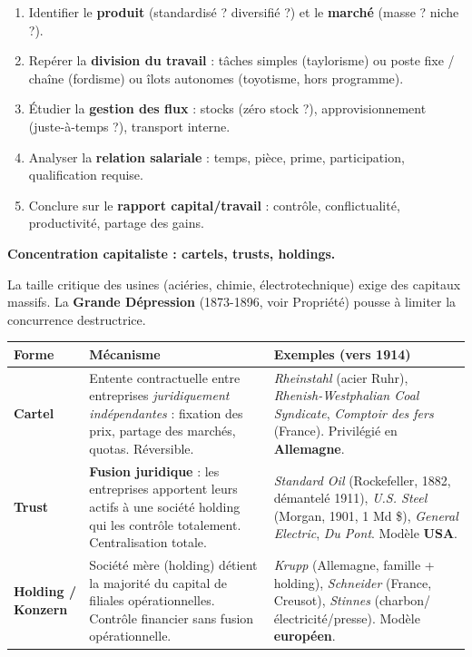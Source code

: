 \documentclass[11pt]{article}
\begin{document}
\begin{methode}
\begin{enumerate}
    \item Identifier le \textbf{produit} (standardisé ? diversifié ?) et le \textbf{marché} (masse ? niche ?).
    \item Repérer la \textbf{division du travail} : tâches simples (taylorisme) ou poste fixe / chaîne (fordisme) ou îlots autonomes (toyotisme, hors programme).
    \item Étudier la \textbf{gestion des flux} : stocks (zéro stock ?), approvisionnement (juste-à-temps ?), transport interne.
    \item Analyser la \textbf{relation salariale} : temps, pièce, prime, participation, qualification requise.
    \item Conclure sur le \textbf{rapport capital/travail} : contrôle, conflictualité, productivité, partage des gains.
\end{enumerate}
\end{methode}

\textbf{Concentration capitaliste : cartels, trusts, holdings.}\par
La taille critique des usines (aciéries, chimie, électrotechnique) exige des capitaux massifs. La \textbf{Grande Dépression} (1873-1896, voir Propriété) pousse à limiter la concurrence destructrice.

\begin{center}
\begin{tabularx}{\linewidth}{|l|X|X|}
\hline
\rowcolor{popblueL} \textbf{Forme} & \textbf{Mécanisme} & \textbf{Exemples (vers 1914)} \\
\hline
\textbf{Cartel} & Entente contractuelle entre entreprises \emph{juridiquement indépendantes} : fixation des prix, partage des marchés, quotas. Réversible. & \emph{Rheinstahl} (acier Ruhr), \emph{Rhenish-Westphalian Coal Syndicate}, \emph{Comptoir des fers} (France). Privilégié en \textbf{Allemagne}. \\
\hline
\textbf{Trust} & \textbf{Fusion juridique} : les entreprises apportent leurs actifs à une société holding qui les contrôle totalement. Centralisation totale. & \emph{Standard Oil} (Rockefeller, 1882, démantelé 1911), \emph{U.S. Steel} (Morgan, 1901, 1 Md \$), \emph{General Electric}, \emph{Du Pont}. Modèle \textbf{USA}. \\
\hline
\textbf{Holding / Konzern} & Société mère (holding) détient la majorité du capital de filiales opérationnelles. Contrôle financier sans fusion opérationnelle. & \emph{Krupp} (Allemagne, famille + holding), \emph{Schneider} (France, Creusot), \emph{Stinnes} (charbon/électricité/presse). Modèle \textbf{européen}. \\
\hline
\end{tabularx}
\end{center}
\end{document}
